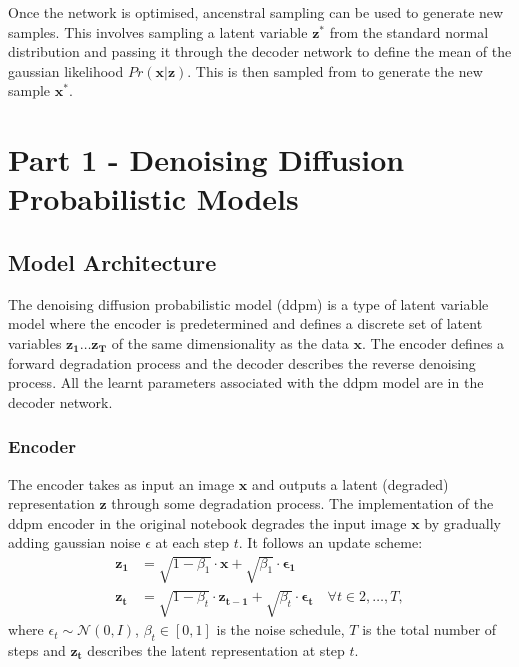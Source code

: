 \documentclass[11pt]{article}
\begin{document}
Once the network is optimised, ancenstral sampling can be used to generate new samples. This involves sampling a latent variable $\mathbf{z^*}$ from the standard normal distribution and passing it through the decoder network to define the mean of the gaussian likelihood $Pr(\mathbf{x}|\mathbf{z})$. This is then sampled from to generate the new sample $\mathbf{x^*}$.

\section{Part 1 - Denoising Diffusion Probabilistic Models}
\subsection{Model Architecture}
The denoising diffusion probabilistic model (ddpm) is a type of latent variable model where the encoder is predetermined and defines a discrete set of latent variables $\mathbf{z_1} \ldots \mathbf{z_T}$ of the same dimensionality as the data $\mathbf{x}$. The encoder defines a forward degradation process and the decoder describes the reverse denoising process. All the learnt parameters associated with the ddpm model are in the decoder network.

\subsubsection{Encoder}
The encoder takes as input an image $\mathbf{x}$ and outputs a latent (degraded) representation $\mathbf{z}$ through some degradation process. The implementation of the ddpm encoder in the original notebook degrades the input image $\mathbf{x}$ by gradually adding gaussian noise $\epsilon$ at each step $t$. It follows an update scheme:
\begin{equation}
    \begin{aligned}
        \mathbf{z_1} &= \sqrt{1-\beta_1} \cdot \mathbf{x} + \sqrt{\beta_1} \cdot \boldsymbol{\epsilon_1} \\
        \mathbf{z_t} &= \sqrt{1-\beta_t} \cdot \mathbf{z_{t-1}} + \sqrt{\beta_t} \cdot \boldsymbol{\epsilon_t} \quad \forall t \in 2, \ldots, T,
    \end{aligned}
    \label{eq:z_t_beta_gauss_noise}
\end{equation}
where $\epsilon_t \sim \mathcal{N}(0, I)$, $\beta_t \in [0,1]$ is the noise schedule, $T$ is the total number of steps and $\mathbf{z_t}$ describes the latent representation at step $t$.
\end{document}
